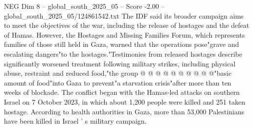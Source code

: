 \begin{textsample}{NEG Dim 8 – global\_south\_2025\_05 – Score -2.00 – global\_south\_2025\_05/124861542.txt}
The IDF said its broader campaign aims to meet the objectives of the war, including the release of hostages and the defeat of Hamas.
However, the Hostages and Missing Families Forum, which represents families of those still held in Gaza, warned that the operations pose"grave and escalating dangers"to the hostages."Testimonies from released hostages describe significantly worsened treatment following military strikes, including physical abuse, restraint and reduced food,"the group @ @ @ @ @ @ @ @ @ @"basic amount of food"into Gaza to prevent"a starvation crisis"after more than ten weeks of blockade.
The conflict began with the Hamas-led attacks on southern Israel on 7 October 2023, in which about 1,200 people were killed and 251 taken hostage.
According to health authorities in Gaza, more than 53,000 Palestinians have been killed in Israel ' s military campaign.

\end{textsample}
